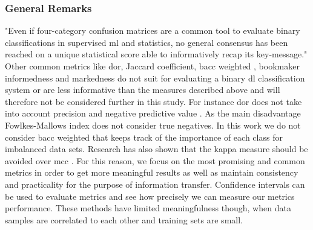 \begin{comment}
In summary both analysis methods, \acrshort{auroc} \cite{Halligan.2015}\cite{Wald.2014} and \acrshort{aupr} score \cite{Raghavan.1989}, suffer from several drawbacks that can lead to misleading conclusions. To solve this problem Hoffman and colleagues have recently introduced a new metric that compares classifiers more clearly. The \acrshort{mcc}-F1-score is the area under curve of the \acrshort{mcc} against the F1-score \cite{Hoffman.2020}. The \acrshort{mcc} axis is unit-normalized (add one, then divide by two) so that both, the x-/ and y-axis have the range [0, 1]. This results in an optimal score with the best performance by the classification model of [1,1] in the upper right corner and a point of the worst performance in the bottom left corner with coordinates: [0,0]. For random predictions the \acrshort{mcc} gives a value of 0. This yields to a random line with unit-normalized \acrshort{mcc} equal 0.5 \cite{Hoffman.2020}.
\end{comment}

\subsubsection{General Remarks}

"Even if four-category confusion matrices are a common tool to evaluate binary classifications in supervised \acrshort{ml} and statistics, no general consensus has been reached on a unique statistical score able to informatively recap its key-message." \cite{Chicco.2021} Other common metrics like \acrfull{dor}, Jaccard coefficient, \acrshort{bacc} weighted \cite{Grandini.8132020}, bookmaker informedness and markedness \cite{Chicco.2021b} do not suit for evaluating a binary \acrshort{dl} classification system or are less informative than the measures described above and will therefore not be considered further in this study. For instance \acrfull{dor} does not take into account precision and negative predictive value \cite{Chicco.2021}. As the main disadvantage Fowlkes-Mallows index does not consider true negatives. In this work we do not consider \acrshort{bacc} weighted that keeps track of the importance of each class for imbalanced data sets. Research has also shown that the kappa measure should be avoided over \acrshort{mcc} \cite{Delgado.2019}. For this reason, we focus on the most promising and common metrics in order to get more meaningful results as well as maintain consistency and practicality for the purpose of information transfer. Confidence intervals can be used to evaluate metrics and see how precisely we can measure our metrics performance. These methods have limited meaningfulness though, when data samples are correlated to each other and training sets are small.


